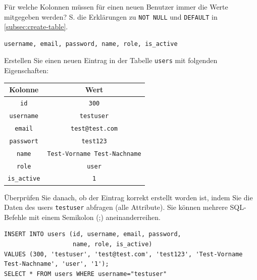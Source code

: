\begin{myexercise}
\label{aufg:sql-insert}
  Für welche Kolonnen müssen für einen neuen Benutzer immer die Werte mitgegeben werden? S. die Erklärungen zu \lstinline[style=sql]|NOT NULL| und \lstinline[style=sql]|DEFAULT| in \cref{subsec:create-table}.
  \begin{myanswer}
    \begin{verbatim}
username, email, password, name, role, is_active
\end{verbatim}
  \end{myanswer}
\end{myexercise}
\begin{mysubmission}
  Erstellen Sie einen neuen Eintrag in der Tabelle \texttt{users} mit folgenden Eigenschaften:
  \begin{table}[H]
    \centering
    \begin{tabular}{c|c}
      \textbf{Kolonne}    & \textbf{Wert}                       \\\midrule
      \texttt{id}         & \texttt{300}                        \\
      \texttt{username}   & \texttt{testuser}                   \\
      \texttt{email}      & \texttt{test@test.com}              \\
      \texttt{passwort}   & \texttt{test123}                    \\
      \texttt{name}       & \texttt{Test-Vorname Test-Nachname} \\
      \texttt{role}       & \texttt{user}                       \\
      \texttt{is\_active} & \texttt{1}                          \\
    \end{tabular}
  \end{table}
  Überprüfen Sie danach, ob der Eintrag korrekt erstellt worden ist, indem Sie die Daten des users \texttt{testuser} abfragen (alle Attribute). Sie können mehrere SQL-Befehle mit einem Semikolon (;) aneinanderreihen.
  \begin{myanswer}
    \begin{lstlisting}[style=sql]
INSERT INTO users (id, username, email, password, 
				   name, role, is_active) 
VALUES (300, 'testuser', 'test@test.com', 'test123', 'Test-Vorname Test-Nachname', 'user', '1');
SELECT * FROM users WHERE username="testuser"
\end{lstlisting}
  \end{myanswer}
\end{mysubmission}

